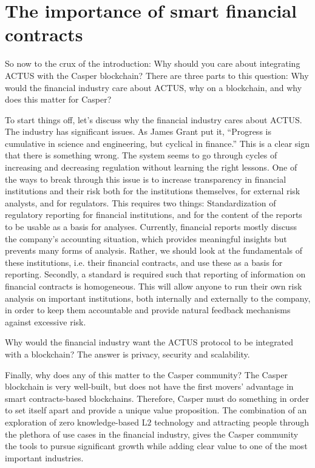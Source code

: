 \documentclass[12pt]{article}
\begin{document}
\section{The importance of smart financial contracts}

So now to the crux of the introduction: Why should you care about integrating
ACTUS with the Casper blockchain? There are three parts to this question: Why
would the financial industry care about ACTUS, why on a blockchain, and why does
this matter for Casper?

To start things off, let's discuss why the financial industry cares about ACTUS.
The industry has significant issues. As James Grant put it, ``Progress is
cumulative in science and engineering, but cyclical in finance.'' This is a
clear sign that there is something wrong. The system seems to go through cycles
of increasing and decreasing regulation without learning the right lessons. One
of the ways to break through this issue is to increase transparency in financial
institutions and their risk both for the institutions themselves, for external
risk analysts, and for regulators. This requires two things: Standardization of
regulatory reporting for financial institutions, and for the content of the
reports to be usable as a basis for analyses. Currently, financial reports
mostly discuss the company's accounting situation, which provides meaningful
insights but prevents many forms of analysis. Rather, we should look at the
fundamentals of these institutions, i.e. their financial contracts, and use
these as a basis for reporting. Secondly, a standard is required such that
reporting of information on financial contracts is homogeneous. This will allow
anyone to run their own risk analysis on important institutions, both internally
and externally to the company, in order to keep them accountable and provide
natural feedback mechanisms against excessive risk.

Why would the financial industry want the ACTUS protocol to be integrated with a
blockchain? The answer is privacy, security and scalability.

Finally, why does any of this matter to the Casper community? The Casper
blockchain is very well-built, but does not have the first movers' advantage in
smart contracts-based blockchains. Therefore, Casper must do something in order
to set itself apart and provide a unique value proposition. The combination of
an exploration of zero knowledge-based L$2$ technology and attracting people
through the plethora of use cases in the financial industry, gives the Casper
community the tools to pursue significant growth while adding clear value to one
of the most important industries.
\end{document}
